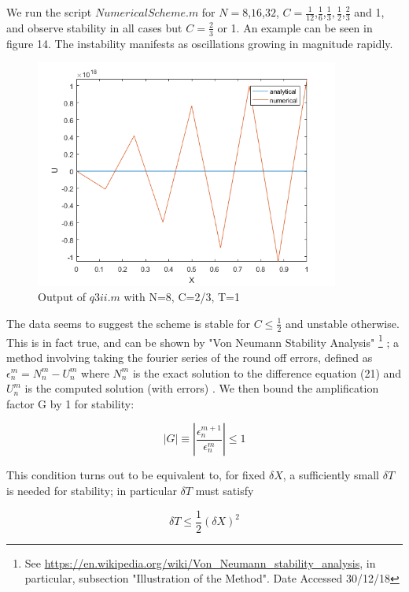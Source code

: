 \documentclass[10pt,a4paper]{report}
\begin{document}
We run the script $NumericalScheme.m$ for $N=8$,$16$,$32$, $C=\frac{1}{12}$,$\frac{1}{6}$,$\frac{1}{3},\frac{1}{2}$,$\frac{2}{3}$ and 1, and observe stability in all cases but $C=\frac{2}{3}$ or 1. An example can be seen in figure 14. The instability manifests as oscillations growing in magnitude rapidly.

\begin{figure}[h]
\centering
\includegraphics[width=10cm]{unstable}
\caption{Output of $q3ii.m$ with N=8, C=2/3, T=1}
\end{figure}

The data seems to suggest the scheme is stable for $C\leq\frac{1}{2}$ and unstable otherwise. This is in fact true, and can be shown by "Von Neumann Stability Analysis"  \footnote{
See \url{https://en.wikipedia.org/wiki/Von_Neumann_stability_analysis}, in particular, subsection "Illustration of the Method". Date Accessed 30/12/18}
; a method involving taking the fourier series of the round off errors, defined as 
  $\epsilon_n^m = N_n^m - U_n^m$ where $N_n^m$ is the exact solution to the difference equation (21) and $U_n^m$ is the computed solution (with errors) . We then bound the amplification factor G by 1 for stability:
  
\begin{equation*} 
|G| \equiv |\frac{\epsilon_n^{m+1}}{\epsilon_n^m}| \leq 1
\end{equation*}

This condition turns out to be equivalent to, for fixed $\delta X$, a sufficiently small $\delta T$ is needed for stability; in particular $\delta T$ must satisfy

\begin{equation*}
\delta T \leq \frac{1}{2}(\delta X)^2
\end{equation*}
\end{document}

